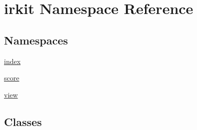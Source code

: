 \hypertarget{namespaceirkit}{}\section{irkit Namespace Reference}
\label{namespaceirkit}
\subsection*{Namespaces}
\begin{DoxyCompactItemize}
\item 
 \hyperlink{namespaceirkit_1_1index}{index}
\item 
 \hyperlink{namespaceirkit_1_1score}{score}
\item 
 \hyperlink{namespaceirkit_1_1view}{view}
\end{DoxyCompactItemize}
\subsection*{Classes}
